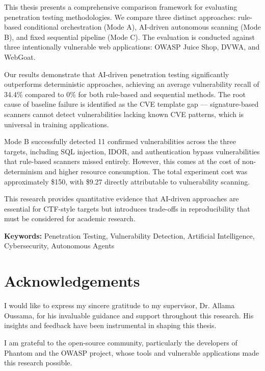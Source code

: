 \documentclass[12pt,a4paper,oneside]{book}
\begin{document}
This thesis presents a comprehensive comparison framework for evaluating penetration testing methodologies. We compare three distinct approaches: rule-based conditional orchestration (Mode A), AI-driven autonomous scanning (Mode B), and fixed sequential pipeline (Mode C). The evaluation is conducted against three intentionally vulnerable web applications: OWASP Juice Shop, DVWA, and WebGoat.

Our results demonstrate that AI-driven penetration testing significantly outperforms deterministic approaches, achieving an average vulnerability recall of 34.4\% compared to 0\% for both rule-based and sequential methods. The root cause of baseline failure is identified as the CVE template gap — signature-based scanners cannot detect vulnerabilities lacking known CVE patterns, which is universal in training applications.

Mode B successfully detected 11 confirmed vulnerabilities across the three targets, including SQL injection, IDOR, and authentication bypass vulnerabilities that rule-based scanners missed entirely. However, this comes at the cost of non-determinism and higher resource consumption. The total experiment cost was approximately \$150, with \$9.27 directly attributable to vulnerability scanning.

This research provides quantitative evidence that AI-driven approaches are essential for CTF-style targets but introduces trade-offs in reproducibility that must be considered for academic research.

\vfill
\textbf{Keywords:} Penetration Testing, Vulnerability Detection, Artificial Intelligence, Cybersecurity, Autonomous Agents

\cleardoublepage

\chapter*{Acknowledgements}
\vspace{1cm}

I would like to express my sincere gratitude to my supervisor, Dr. Allama Oussama, for his invaluable guidance and support throughout this research. His insights and feedback have been instrumental in shaping this thesis.

I am grateful to the open-source community, particularly the developers of Phantom and the OWASP project, whose tools and vulnerable applications made this research possible.
\end{document}
